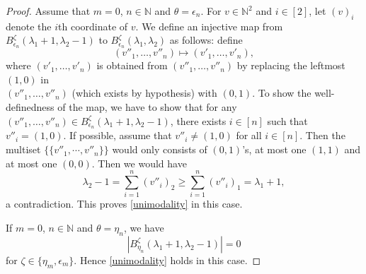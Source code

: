 \documentclass[12pt,reqno]{amsart}
\theoremstyle{definition}
\theoremstyle{remark}
\begin{document}
\begin{proof}
Assume that $m=0$, $n\in\mathbb{N}$ and $\theta=\epsilon_n$. For $v\in\mathbb{N}^{2}$ and $i\in[2]$, let $(v)_{i}$ denote the $i$th coordinate of $v$. We define an injective map from $B^{\zeta}_{\epsilon_{n}}(\lambda_{1}+1,\lambda_{2}-1)$ to $B^{\zeta}_{\epsilon_{n}}(\lambda_{1},\lambda_{2})$ as follows: define $$(v''_{1},\dotsc, v''_{n})\mapsto (v'_{1},\dotsc, v'_{n}),$$
where $(v'_{1},\dotsc, v'_{n})$ is obtained from $(v''_{1},\dotsc, v''_{n})$ by replacing the leftmost $(1,0)$ in\\ $(v''_{1},\dotsc, v''_{n})$ (which exists by hypothesis) with $(0,1)$. To show the well-definedness of the map, we have to show that for any $(v''_{1},\dotsc, v''_{n})\in B^{\zeta}_{\epsilon_{n}}(\lambda_{1}+1,\lambda_{2}-1)$, there exists $i\in[n]$ such that $v''_{i}=(1,0)$. If possible, assume that $v''_i\neq (1,0)$ for all $i\in[n]$. Then the multiset $\{\{v''_{1},\cdots,v''_{n}\}\}$ would only consists of $(0,1)$'s, at most one $(1,1)$ and at most one $(0,0)$. Then we would have $$\lambda_{2}-1= \sum_{i=1}^{n}(v''_{i})_2 \geq \sum_{i=1}^{n}(v''_{i})_1 = \lambda_{1}+1,$$ a contradiction.  This proves \eqref{unimodality} in this case.

If $m=0$, $n\in\mathbb{N}$ and $\theta=\eta_n$, we have $$|B^{\zeta}_{\eta_{n}}(\lambda_{1}+1,\lambda_{2}-1)|=0$$ for $\zeta\in\{\eta_{m},\epsilon_{m}\}$.  Hence \eqref{unimodality} holds in this case.

\end{proof}
\end{document}
